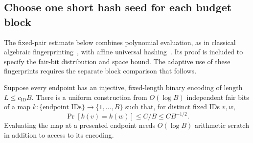 \subsection{Choose one short hash seed for each budget block}

The fixed-pair estimate below combines polynomial evaluation, as in
classical algebraic fingerprinting~\cite{Schwartz1980}, with affine
universal hashing~\cite{CarterWegman1979}. Its proof is included to
specify the fair-bit distribution and space bound. The adaptive use of
these fingerprints requires the separate block comparison that follows.

\begin{lemma}\label{lem:fp-hash}
Suppose every endpoint has an injective, fixed-length binary encoding of
length $L\le c_{\mathrm{ID}}B$.  There is a uniform construction from
$O(\log B)$ independent fair bits of a map
$k:\{\text{endpoint IDs}\}\longrightarrow\{1,\ldots,B\}$ such that, for
distinct fixed IDs $v,w$,
\begin{equation}
 \Pr[k(v)=k(w)]\le C/B\le C B^{-1/2}.
 \label{eq:fp-pair-collision}
\end{equation}
Evaluating the map at a presented endpoint needs $O(\log B)$ arithmetic
scratch in addition to access to its encoding.
\end{lemma}

